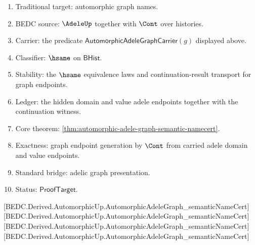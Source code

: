 \begin{enumerate}
  \item Traditional target: automorphic graph names.
  \item BEDC source: $\AdeleUp$ together with $\Cont$ over histories.
  \item Carrier: the predicate
  $\mathsf{AutomorphicAdeleGraphCarrier}(g)$ displayed above.
  \item Classifier: $\hsame$ on $\mathsf{BHist}$.
  \item Stability: the $\hsame$ equivalence laws and continuation-result
  transport for graph endpoints.
  \item Ledger: the hidden domain and value adele endpoints together with the
  continuation witness.
  \item Core theorem: \autoref{thm:automorphic-adele-graph-semantic-namecert}.
  \item Exactness: graph endpoint generation by $\Cont$ from carried adele
  domain and value endpoints.
  \item Standard bridge: adelic graph presentation.
  \item Status: $\mathsf{ProofTarget}$.
\end{enumerate}

[BEDC.Derived.AutomorphicUp.AutomorphicAdeleGraph\_semanticNameCert]
[BEDC.Derived.AutomorphicUp.AutomorphicAdeleGraph\_semanticNameCert]
[BEDC.Derived.AutomorphicUp.AutomorphicAdeleGraph\_semanticNameCert]
[BEDC.Derived.AutomorphicUp.AutomorphicAdeleGraph\_semanticNameCert]

